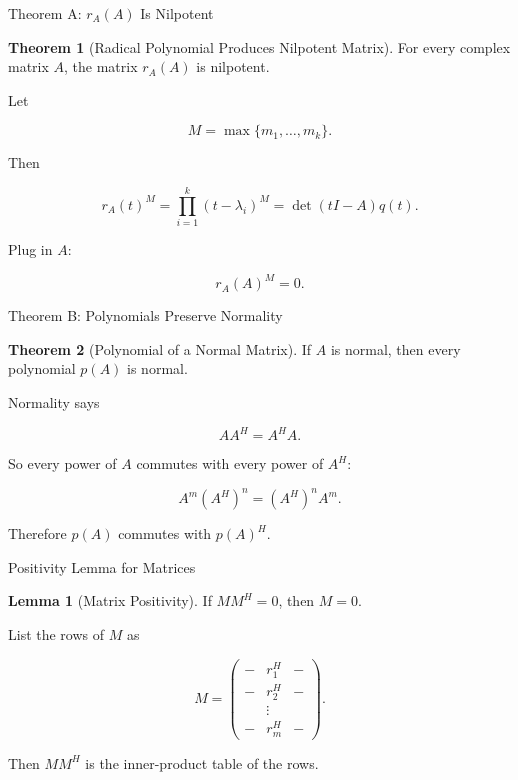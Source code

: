 \documentclass[10pt]{beamer}
\theoremstyle{definition}
\newtheorem{lem}{Lemma}[section]
\newtheorem{thm}{Theorem}[section]
\begin{document}
\begin{frame}{Theorem A: $r_A(A)$ Is Nilpotent}

\begin{thm}[Radical Polynomial Produces Nilpotent Matrix]
For every complex matrix $A$, the matrix $r_A(A)$ is nilpotent.
\end{thm}

\vfill

Let

$$
M=\max\{m_1,\ldots,m_k\}.
$$

Then

$$
r_A(t)^M
=\prod_{i=1}^k(t-\lambda_i)^M
=\det(tI-A)q(t).
$$

\vfill

Plug in $A$:

$$
r_A(A)^M=0.
$$

\end{frame}

\begin{frame}{Theorem B: Polynomials Preserve Normality}

\begin{thm}[Polynomial of a Normal Matrix]
If $A$ is normal, then every polynomial $p(A)$ is normal.
\end{thm}

\vfill

Normality says

$$
AA^H=A^HA.
$$

\vfill

So every power of $A$ commutes with every power of $A^H$:

$$
A^m(A^H)^n=(A^H)^nA^m.
$$

\vfill

Therefore $p(A)$ commutes with $p(A)^H$.

\end{frame}

\begin{frame}{Positivity Lemma for Matrices}

\begin{lem}[Matrix Positivity]
If $MM^H=0$, then $M=0$.
\end{lem}

\vfill

List the rows of $M$ as

$$
M=
\begin{pmatrix}
-&r_1^H&-\\
-&r_2^H&-\\
 &\vdots& \\
-&r_m^H&-
\end{pmatrix}.
$$

\vfill

Then $MM^H$ is the inner-product table of the rows.

\end{frame}
\end{document}
